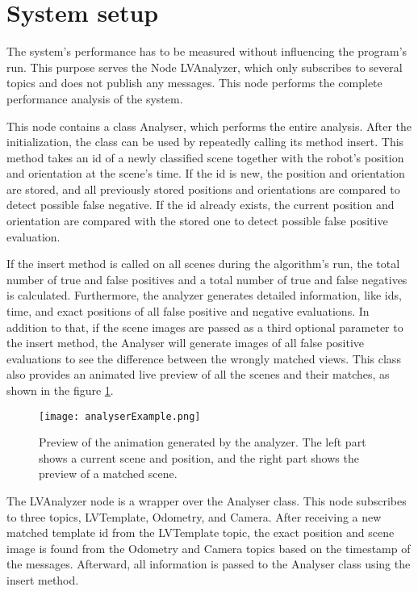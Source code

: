 \section{System setup}\label{section:SystemSetup}

The system's performance has to be measured without influencing the program's run. This purpose serves the Node LVAnalyzer, which only subscribes to several topics and does not publish any messages. This node performs the complete performance analysis of the system.\par
This node contains a class Analyser, which performs the entire analysis. After the initialization, the class can be used by repeatedly calling its method insert. This method takes an id of a newly classified scene together with the robot's position and orientation at the scene's time. If the id is new, the position and orientation are stored, and all previously stored positions and orientations are compared to detect possible false negative. If the id already exists, the current position and orientation are compared with the stored one to detect possible false positive evaluation.\par
If the insert method is called on all scenes during the algorithm's run, the total number of true and false positives and a total number of true and false negatives is calculated. Furthermore, the analyzer generates detailed information, like ids, time, and exact positions of all false positive and negative evaluations. In addition to that, if the scene images are passed as a third optional parameter to the insert method, the Analyser will generate images of all false positive evaluations to see the difference between the wrongly matched views. This class also provides an animated live preview of all the scenes and their matches, as shown in the figure \ref{fig:analExample}.\par

\begin{figure}[htpb]
    \centering
    \texttt{[image: analyserExample.png]}
    \caption[Preview of the animation generated by the analyzer]{Preview of the animation generated by the analyzer. The left part shows a current scene and position, and the right part shows the preview of a matched scene.} \label{fig:analExample}
\end{figure}

The LVAnalyzer node is a wrapper over the Analyser class. This node subscribes to three topics, LVTemplate, Odometry, and Camera. After receiving a new matched template id from the LVTemplate topic, the exact position and scene image is found from the Odometry and Camera topics based on the timestamp of the messages. Afterward, all information is passed to the Analyser class using the insert method.
